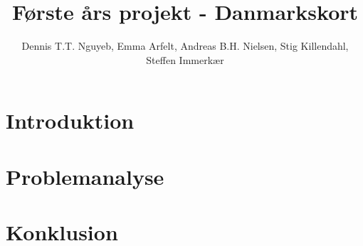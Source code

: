 \documentclass[11pt,a4paper]{report}
\author{Dennis T.T. Nguyeb, Emma Arfelt, Andreas B.H. Nielsen, Stig Killendahl, Steffen Immerkær}
\title{Første års projekt - Danmarkskort}
\begin{document}
\chapter{Introduktion}

\chapter{Problemanalyse}



\chapter{Konklusion}
\end{document}
